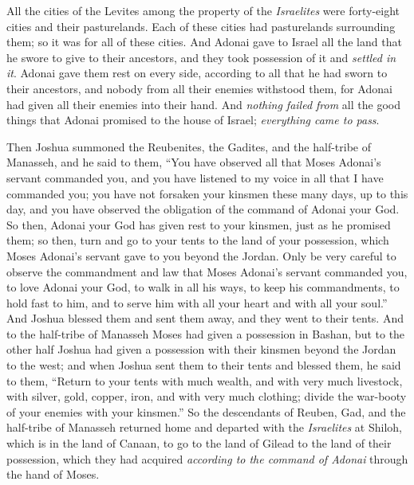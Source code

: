 \begin{biblechapter}
\verse All the cities of the Levites among the property of the \textit{Israelites} were forty-eight cities and their pasturelands.
\verse Each of these cities had pasturelands surrounding them; so it was for all of these cities.
\verse And Adonai gave to Israel all the land that he swore to give to their ancestors, and they took possession of it and \textit{settled in it}.
\verse Adonai gave them rest on every side, according to all that he had sworn to their ancestors, and nobody from all their enemies withstood them, for Adonai had given all their enemies into their hand.
\verse And \textit{nothing failed from} all the good things that Adonai promised to the house of Israel; \textit{everything came to pass}.
\end{biblechapter}

\begin{biblechapter} %
 Then Joshua summoned the Reubenites, the Gadites, and the half-tribe of Manasseh,
\verse and he said to them, “You have observed all that Moses Adonai’s servant commanded you, and you have listened to my voice in all that I have commanded you;
\verse you have not forsaken your kinsmen these many days, up to this day, and you have observed the obligation of the command of Adonai your God.
\verse So then, Adonai your God has given rest to your kinsmen, just as he promised them; so then, turn and go to your tents to the land of your possession, which Moses Adonai’s servant gave to you beyond the Jordan.
\verse Only be very careful to observe the commandment and law that Moses Adonai’s servant commanded you, to love Adonai your God, to walk in all his ways, to keep his commandments, to hold fast to him, and to serve him with all your heart and with all your soul.”
\verse And Joshua blessed them and sent them away, and they went to their tents.
\verse And to the half-tribe of Manasseh Moses had given a possession in Bashan, but to the other half Joshua had given a possession with their kinsmen beyond the Jordan to the west; and when Joshua sent them to their tents and blessed them,
\verse he said to them, “Return to your tents with much wealth, and with very much livestock, with silver, gold, copper, iron, and with very much clothing; divide the war-booty of your enemies with your kinsmen.”
\verse So the descendants of Reuben, Gad, and the half-tribe of Manasseh returned home and departed with the \textit{Israelites} at Shiloh, which is in the land of Canaan, to go to the land of Gilead to the land of their possession, which they had acquired \textit{according to the command of Adonai} through the hand of Moses.

\end{biblechapter}
